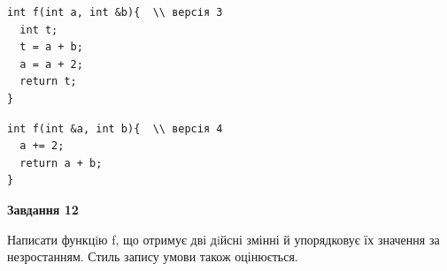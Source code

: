 \documentclass[12pt, ukrainian]{article}
\begin{document}
{\begin {large}
\begin{minipage}[t]{11.0cm}
\vspace{-8mm}\begin{verbatim}
int f(int a, int &b){  \\ версія 3
  int t;
  t = a + b;
  a = a + 2;
  return t;
}
\end{verbatim}

\vspace{-8mm}\begin{verbatim}
int f(int &a, int b){  \\ версія 4
  a += 2;
  return a + b;
}
\end{verbatim}



\begin{center}
\textbf{Завдання 12}
\end{center}

Написати функцiю f, що отримує дві дiйсні змінні й упорядковує їх значення за незростанням. Стиль запису умови також оцінюється.\par

\end{minipage}

\end {large}}
\newpage
\end{document}
